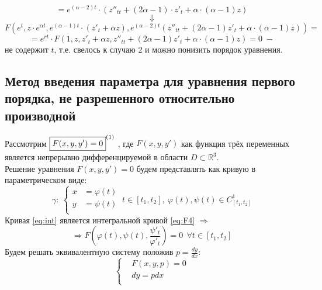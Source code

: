\begin{corollary}
\begin{enumerate}
\[            \]	
            \[	
                = e^{(\alpha - 2)t} \cdot (z''_{tt} + (2\alpha - 1)\cdot z'_t + \alpha \cdot (\alpha - 1)z)
            \]
            \[
            \Downarrow
            \]
            \[
                F(e^t, z \cdot e^{\alpha t}, e^{(\alpha - 1)t} \cdot (z'_t + \alpha z), e^{(\alpha - 2)t}(z''_{tt} + (2\alpha - 1)z'_t + \alpha \cdot (\alpha - 1)z) ) =
            \]
            \[
                = e^{rt} \cdot F(1, z, z'_t + \alpha z, z''_{tt} + (2\alpha - 1)z'_t + \alpha \cdot (\alpha - 1)z) = 0 \; -
            \]
            не содержит $t$, т.е. свелось к случаю 2 и можно понизить порядок уравнения.
    \end{enumerate}
\end{corollary}

\subsection{Метод введения параметра для уравнения первого порядка, не разрешенного относительно производной}
\begin{proposition}
    Рассмотрим $ \boxed{F(x,  y, y') = 0}^{\eqnum\label{eq:F4}} \ $, где $ F(x, y, y') $ как функция трёх переменных является непрерывно дифференцируемой в области $ D \subset \mathbb{ R }^3 $. \\
    Решение уравнения $F(x, y, y') = 0 $ будем представлять как кривую в параметрическом виде: \\
    \begin{equation} \label{eq:int}
    \gamma: \	\left\{
    \begin{aligned}
        x &= \varphi(t)  \\
        y &= \psi(t) \\   
    \end{aligned}
    \right. \ t \in [t_1, t_2], \ \varphi(t), \psi(t) \in C^1_{[t_1, t_2]}                                             
    \end{equation}
    Кривая \eqref{eq:int} является интегральной кривой \eqref{eq:F4} $ \Rightarrow $ \\
    \begin{equation} \label{eq:F5}
     \Rightarrow F\left(\varphi(t), \psi(t), \frac{\psi'_t}{\varphi'_t}\right) = 0 \ \ \forall t \in [t_1, t_2] 
    \end{equation}
    Будем решать эквивалентную систему положив $p = \frac{dy}{dx} $: 
    \begin{equation} \label{eq:Fs}
        \left\{
        \begin{aligned}
            &F(x, y, p) = 0  \\
            &dy = pdx \\   
        \end{aligned}
        \right.                                                          
    \end{equation}
\end{proposition}

